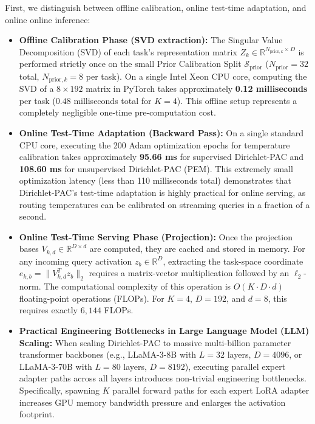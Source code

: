 First, we distinguish between offline calibration, online test-time adaptation, and online online inference:
\begin{itemize}
    \item \textbf{Offline Calibration Phase (SVD extraction):} The Singular Value Decomposition (SVD) of each task's representation matrix $Z_k \in \mathbb{R}^{N_{\text{prior}, k} \times D}$ is performed strictly once on the small Prior Calibration Split $\mathcal{S}_{\text{prior}}$ ($N_{\text{prior}} = 32$ total, $N_{\text{prior}, k} = 8$ per task). On a single Intel Xeon CPU core, computing the SVD of a $8 \times 192$ matrix in PyTorch takes approximately \textbf{0.12 milliseconds} per task ($0.48$ milliseconds total for $K=4$). This offline setup represents a completely negligible one-time pre-computation cost.
    \item \textbf{Online Test-Time Adaptation (Backward Pass):} On a single standard CPU core, executing the 200 Adam optimization epochs for temperature calibration takes approximately \textbf{95.66 ms} for supervised Dirichlet-PAC and \textbf{108.60 ms} for unsupervised Dirichlet-PAC (PEM). This extremely small optimization latency (less than 110 milliseconds total) demonstrates that Dirichlet-PAC's test-time adaptation is highly practical for online serving, as routing temperatures can be calibrated on streaming queries in a fraction of a second.
    \item \textbf{Online Test-Time Serving Phase (Projection):} Once the projection bases $V_{k, d} \in \mathbb{R}^{D \times d}$ are computed, they are cached and stored in memory. For any incoming query activation $z_b \in \mathbb{R}^D$, extracting the task-space coordinate $e_{k, b} = \|V_{k, d}^T z_b\|_2$ requires a matrix-vector multiplication followed by an $\ell_2$-norm. The computational complexity of this operation is $O(K \cdot D \cdot d)$ floating-point operations (FLOPs). For $K=4$, $D=192$, and $d=8$, this requires exactly $6,144$ FLOPs.
    \item \textbf{Practical Engineering Bottlenecks in Large Language Model (LLM) Scaling:} When scaling Dirichlet-PAC to massive multi-billion parameter transformer backbones (e.g., LLaMA-3-8B with $L=32$ layers, $D=4096$, or LLaMA-3-70B with $L=80$ layers, $D=8192$), executing parallel expert adapter paths across all layers introduces non-trivial engineering bottlenecks. Specifically, spawning $K$ parallel forward paths for each expert LoRA adapter increases GPU memory bandwidth pressure and enlarges the activation footprint.
    

\end{itemize}
